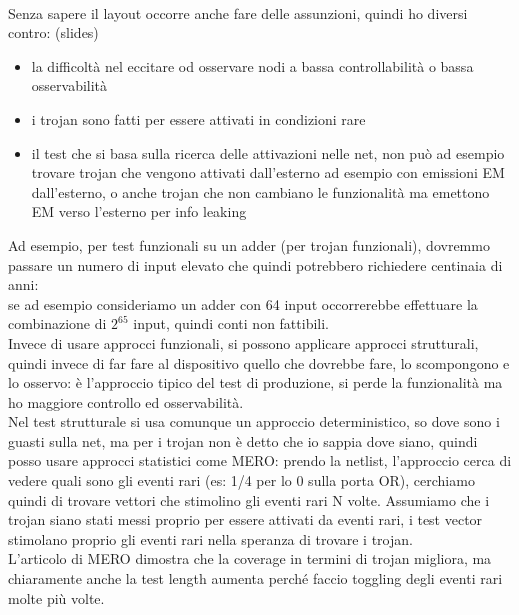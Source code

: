 \documentclass[oneside, 12pt]{extbook}
\begin{document}
\\Senza sapere il layout occorre anche fare delle assunzioni, quindi ho diversi contro: (slides)
\begin{itemize}
	\item la difficoltà nel eccitare od osservare nodi a bassa controllabilità o bassa osservabilità
	\item i trojan sono fatti per essere attivati in condizioni rare
	\item il test che si basa sulla ricerca delle attivazioni nelle net, non può ad esempio trovare trojan che vengono attivati dall'esterno ad esempio con emissioni EM dall'esterno, o anche trojan che non cambiano le funzionalità ma emettono EM verso l'esterno per info leaking
\end{itemize}
Ad esempio, per test funzionali su un adder (per trojan funzionali), dovremmo passare un numero di input elevato che quindi potrebbero richiedere centinaia di anni:\\
se ad esempio consideriamo un adder con 64 input occorrerebbe effettuare la combinazione di $2^{65}$ input, quindi conti non fattibili.
\\Invece di usare approcci funzionali, si possono applicare approcci strutturali, quindi invece di far fare al dispositivo quello che dovrebbe fare, lo scompongono e lo osservo: è l'approccio tipico del test di produzione, si perde la funzionalità ma ho maggiore controllo ed osservabilità.\\Nel test strutturale si usa comunque un approccio deterministico, so dove sono i guasti sulla net, ma per i trojan non è detto che io sappia dove siano, quindi posso usare approcci statistici come MERO: prendo la netlist, l'approccio cerca di vedere quali sono gli eventi rari (es: 1/4 per lo 0 sulla porta OR), cerchiamo quindi di trovare vettori che stimolino gli eventi rari N volte. Assumiamo che i trojan siano stati messi proprio per essere attivati da eventi rari, i test vector stimolano proprio gli eventi rari nella speranza di trovare i trojan.\\L'articolo di MERO dimostra che la coverage in termini di trojan migliora, ma chiaramente anche la test length aumenta perché faccio toggling degli eventi rari molte più volte. 
\end{document}
